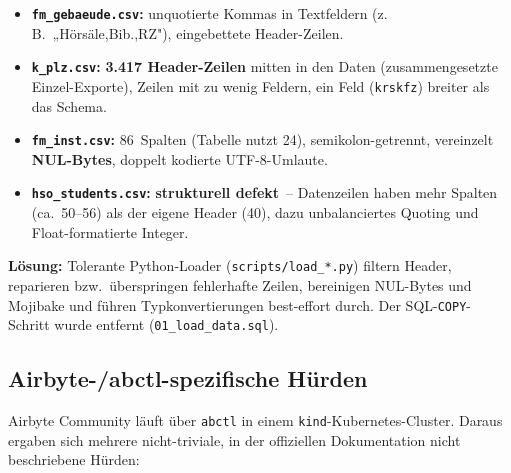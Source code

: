 \documentclass[a4paper,12pt]{article}
\begin{document}
\begin{itemize}[noitemsep, leftmargin=*]
    \item \textbf{\texttt{fm\_gebaeude.csv}:} unquotierte Kommas in Textfeldern
          (z.\,B.\ „Hörsäle,Bib.,RZ"), eingebettete Header-Zeilen.
    \item \textbf{\texttt{k\_plz.csv}:} \textbf{3.417 Header-Zeilen} mitten in den
          Daten (zusammengesetzte Einzel-Exporte), Zeilen mit zu wenig Feldern,
          ein Feld (\texttt{krskfz}) breiter als das Schema.
    \item \textbf{\texttt{fm\_inst.csv}:} 86~Spalten (Tabelle nutzt 24),
          semikolon-getrennt, vereinzelt \textbf{NUL-Bytes},
          doppelt kodierte UTF-8-Umlaute.
    \item \textbf{\texttt{hso\_students.csv}:} \textbf{strukturell defekt}~--
          Datenzeilen haben mehr Spalten (ca.\ 50--56) als der eigene Header (40),
          dazu unbalanciertes Quoting und Float-formatierte Integer.
\end{itemize}
 
\textbf{Lösung:} Tolerante Python-Loader (\texttt{scripts/load\_*.py}) filtern Header,
reparieren bzw.\ überspringen fehlerhafte Zeilen, bereinigen NUL-Bytes und Mojibake und
führen Typkonvertierungen best-effort durch. Der SQL-\texttt{COPY}-Schritt wurde entfernt
(\texttt{01\_load\_data.sql}).
 
\subsection{Airbyte-/abctl-spezifische Hürden}
 
Airbyte Community läuft über \texttt{abctl} in einem \texttt{kind}-Kubernetes-Cluster.
Daraus ergaben sich mehrere nicht-triviale, in der offiziellen Dokumentation nicht
beschriebene Hürden:
 
\end{document}
